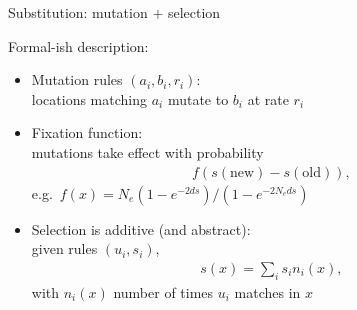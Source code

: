 \documentclass[smaller]{beamer}
\begin{document}
\begin{frame}{Substitution: mutation $+$ selection}

  {\struct Formal-ish description:}

  \begin{itemize}

    \item {\newthing Mutation} rules $(a_i,b_i,r_i)$: \\
      locations matching $a_i$ mutate to $b_i$ at rate $r_i$ \\

    \item {\newthing Fixation} function: \\
      mutations take effect with probability 
      \begin{align*}
        f(s(\text{new}) - s(\text{old})) ,
      \end{align*}
      e.g.\ $f(x) = N_e (1-e^{-2 ds})/(1-e^{-2 N_e ds})$

    \item {\newthing Selection} is additive (and abstract):\\
      given rules $(u_i,s_i)$,
      \begin{align*}
        s(x) = \sum_i s_i n_i(x),
      \end{align*}
      with $n_i(x)$ number of times $u_i$ matches in $x$
      

  \end{itemize}

\end{frame}
\end{document}
